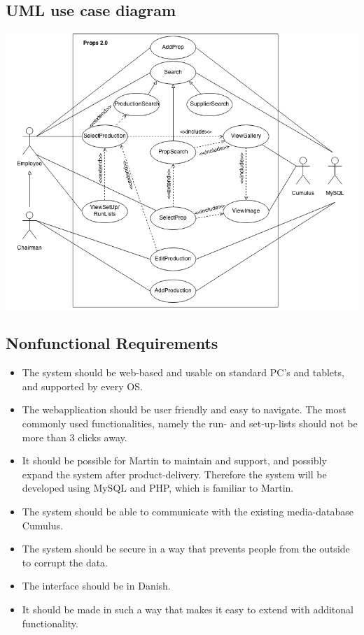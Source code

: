 \documentclass[12pt]{article}
\begin{document}
\subsection{UML use case diagram}
\includegraphics[scale=0.6]{use.png}
\subsection{Nonfunctional Requirements}
\begin{itemize}
  \item The system should be web-based and usable on standard PC's and tablets, and supported by every OS.
  \item The webapplication should be user friendly and easy to navigate. The most commonly used functionalities, namely the run- and set-up-lists should not be more than 3 clicks away.
  \item It should be possible for Martin to maintain and support, and possibly expand the system after product-delivery. Therefore the system will be developed using MySQL and PHP, which is familiar to Martin.
  \item The system should be able to communicate with the existing media-database Cumulus.
  \item The system should be secure in a way that prevents people from the outside to corrupt the data.
  \item The interface should be in Danish.
  \item It should be made in such a way that makes it easy to extend with additonal functionality.
\end{itemize}
\end{document}
